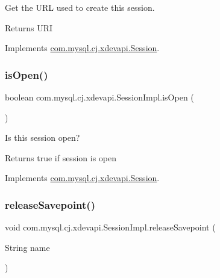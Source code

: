 Get the U\+RL used to create this session.

\begin{DoxyReturn}{Returns}
U\+RI 
\end{DoxyReturn}


Implements \mbox{\hyperlink{interfacecom_1_1mysql_1_1cj_1_1xdevapi_1_1_session_a8c5c670815d5fab8edb586c4a4e684ac}{com.\+mysql.\+cj.\+xdevapi.\+Session}}.

\mbox{\label{classcom_1_1mysql_1_1cj_1_1xdevapi_1_1_session_impl_a0b6cff692d4e7882a546118b25820978}} 
\subsubsection{\texorpdfstring{is\+Open()}{isOpen()}}
{\footnotesize\ttfamily boolean com.\+mysql.\+cj.\+xdevapi.\+Session\+Impl.\+is\+Open (\begin{DoxyParamCaption}{ }\end{DoxyParamCaption})}

Is this session open?

\begin{DoxyReturn}{Returns}
true if session is open 
\end{DoxyReturn}


Implements \mbox{\hyperlink{interfacecom_1_1mysql_1_1cj_1_1xdevapi_1_1_session_a8054b47c7bdc370ab26b41ec9ba527a6}{com.\+mysql.\+cj.\+xdevapi.\+Session}}.

\mbox{\label{classcom_1_1mysql_1_1cj_1_1xdevapi_1_1_session_impl_a8bf42a1928a6bb71f3047e072b9210b4}} 
\subsubsection{\texorpdfstring{release\+Savepoint()}{releaseSavepoint()}}
{\footnotesize\ttfamily void com.\+mysql.\+cj.\+xdevapi.\+Session\+Impl.\+release\+Savepoint (\begin{DoxyParamCaption}\item[{String}]{name }\end{DoxyParamCaption})}

